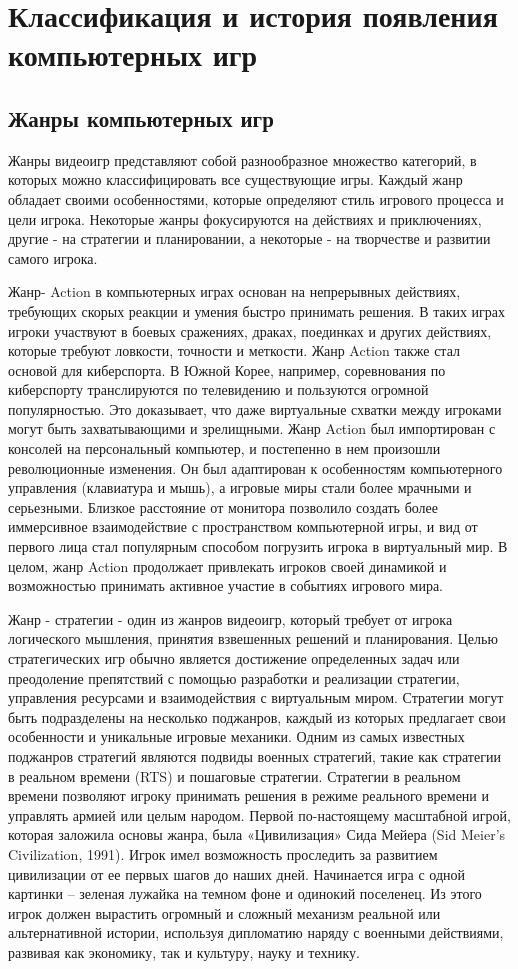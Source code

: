 \section{Классификация и история появления компьютерных игр}
\subsection{Жанры компьютерных игр}
Жанры видеоигр представляют собой разнообразное множество категорий, в которых можно классифицировать все существующие игры. Каждый жанр обладает своими особенностями, которые определяют стиль игрового процесса и цели игрока. Некоторые жанры фокусируются на действиях и приключениях, другие - на стратегии и планировании, а некоторые - на творчестве и развитии самого игрока.

Жанр- Action в компьютерных играх основан на непрерывных действиях, требующих скорых реакции и умения быстро принимать решения. В таких играх игроки участвуют в боевых сражениях, драках, поединках и других действиях, которые требуют ловкости, точности и меткости.  Жанр Action также стал основой для киберспорта. В Южной Корее, например, соревнования по киберспорту транслируются по телевидению и пользуются огромной популярностью. Это доказывает, что даже виртуальные схватки между игроками могут быть захватывающими и зрелищными. Жанр Action был импортирован с консолей на персональный компьютер, и постепенно в нем произошли революционные изменения.  Он был адаптирован к особенностям компьютерного управления (клавиатура и мышь), а игровые миры стали более мрачными и серьезными. Близкое расстояние от монитора позволило создать более иммерсивное взаимодействие с пространством компьютерной игры, и вид от первого лица стал популярным способом погрузить игрока в виртуальный мир. В целом, жанр Action продолжает привлекать игроков своей динамикой и возможностью принимать активное участие в событиях игрового мира.  

Жанр - стратегии - один из жанров видеоигр, который требует от игрока логического мышления, принятия взвешенных решений и планирования. Целью стратегических игр обычно является достижение определенных задач или преодоление препятствий с помощью разработки и реализации стратегии, управления ресурсами и взаимодействия с виртуальным миром. Стратегии могут быть подразделены на несколько поджанров, каждый из которых предлагает свои особенности и уникальные игровые механики. Одним из самых известных поджанров стратегий являются подвиды военных стратегий, такие как стратегии в реальном времени (RTS) и пошаговые стратегии. Стратегии в реальном времени позволяют игроку принимать решения в режиме реального времени и управлять армией или целым народом. Первой по-настоящему масштабной игрой, которая заложила основы жанра, была «Цивилизация» Сида Мейера (Sid Meier's Civilization, 1991). Игрок имел возможность проследить за развитием цивилизации от ее первых шагов до наших дней. Начинается игра с одной картинки – зеленая лужайка на темном фоне и одинокий поселенец. Из этого игрок должен вырастить огромный и сложный механизм реальной или альтернативной истории, используя дипломатию наряду с военными действиями, развивая как экономику, так и культуру, науку и технику.


